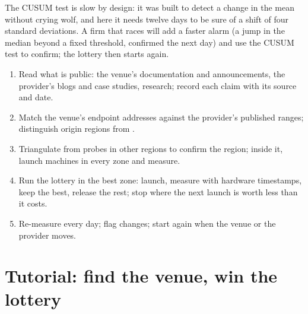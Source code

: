 The CUSUM test is slow by design: it was built to detect a change in the mean without crying wolf, and here it needs twelve days to be sure of a
shift of four standard deviations. A firm that races will add a faster alarm (a jump in the median beyond a fixed threshold, confirmed the next day)
and use the CUSUM test to confirm; the lottery then starts again.

\begin{method}\label{met:nw:where-the-crypto-venues-live:find}
\begin{enumerate}
\item Read what is public: the venue's documentation and announcements, the provider's blogs and case studies, research; record each claim with its
  source and date.
\item Match the venue's endpoint addresses against the provider's published ranges; distinguish origin regions from .
\item Triangulate from probes in other regions to confirm the region; inside it, launch machines in every zone and measure.
\item Run the lottery in the best zone: launch, measure with hardware timestamps, keep the best, release the rest; stop where the next launch is worth
  less than it costs.
\item Re-measure every day; flag changes; start again when the venue or the provider moves.
\end{enumerate}
\end{method}

\section{Tutorial: find the venue, win the lottery}\label{tut:nw:where-the-crypto-venues-live:tut}

